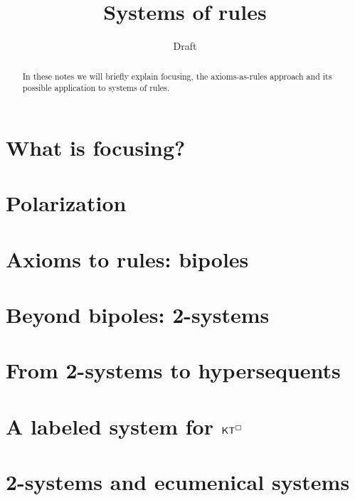 \documentclass{llncs}
\title{Systems of rules}
\author{Draft}
\institute{\today}
\begin{document}
\maketitle

\begin{abstract}
In these notes we will briefly explain focusing, the axioms-as-rules
approach and its possible application to systems of rules. 
\end{abstract}


\section{What is focusing?}\label{sec:intro}



\section{Polarization}\label{sec:polarization}


\section{Axioms to rules: bipoles}\label{sec:bipol}


\section{Beyond bipoles: 2-systems}


\section{From 2-systems to hypersequents}


\section{A labeled system for $\mathsf{K}\mathsf{T}^\Box$}


\section{2-systems and ecumenical systems}\label{sec:ec}



\end{document}
